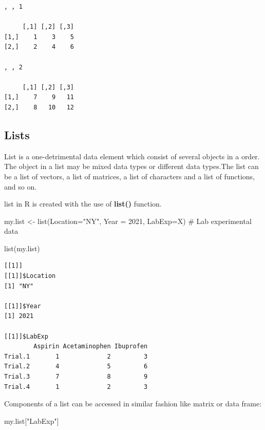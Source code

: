 \documentclass[
  letterpaper,
  DIV=11,
  numbers=noendperiod]{scrreprt}
\newenvironment{Shaded}{\begin{snugshade}}{\end{snugshade}}
\newcommand{\AttributeTok}[1]{\textcolor[rgb]{0.40,0.45,0.13}{#1}}
\newcommand{\CommentTok}[1]{\textcolor[rgb]{0.37,0.37,0.37}{#1}}
\newcommand{\DecValTok}[1]{\textcolor[rgb]{0.68,0.00,0.00}{#1}}
\newcommand{\FunctionTok}[1]{\textcolor[rgb]{0.28,0.35,0.67}{#1}}
\newcommand{\NormalTok}[1]{\textcolor[rgb]{0.00,0.23,0.31}{#1}}
\newcommand{\OtherTok}[1]{\textcolor[rgb]{0.00,0.23,0.31}{#1}}
\newcommand{\StringTok}[1]{\textcolor[rgb]{0.13,0.47,0.30}{#1}}
\begin{document}
\begin{verbatim}
, , 1

     [,1] [,2] [,3]
[1,]    1    3    5
[2,]    2    4    6

, , 2

     [,1] [,2] [,3]
[1,]    7    9   11
[2,]    8   10   12
\end{verbatim}

\hypertarget{lists}{%
\subsection{Lists}\label{lists}}

List is a one-detrimental data element which consist of several objects
in a order. The object in a list may be mixed data types or different
data types.The list can be a list of vectors, a list of matrices, a list
of characters and a list of functions, and so on.

list in R is created with the use of \textbf{list()} function.

\begin{Shaded}
\begin{Highlighting}[]
\NormalTok{my.list }\OtherTok{\textless{}{-}} \FunctionTok{list}\NormalTok{(}\AttributeTok{Location=}\StringTok{"NY"}\NormalTok{, }
                \AttributeTok{Year =} \DecValTok{2021}\NormalTok{,}
                \AttributeTok{LabExp=}\NormalTok{X) }\CommentTok{\# Lab experimental data}
             

\FunctionTok{list}\NormalTok{(my.list)}
\end{Highlighting}
\end{Shaded}

\begin{verbatim}
[[1]]
[[1]]$Location
[1] "NY"

[[1]]$Year
[1] 2021

[[1]]$LabExp
        Aspirin Acetaminophen Ibuprofen
Trial.1       1             2         3
Trial.2       4             5         6
Trial.3       7             8         9
Trial.4       1             2         3
\end{verbatim}

Components of a list can be accessed in similar fashion like matrix or
data frame:

\begin{Shaded}
\begin{Highlighting}[]
\NormalTok{my.list[}\StringTok{"LabExp"}\NormalTok{]}
\end{Highlighting}
\end{Shaded}
\end{document}
